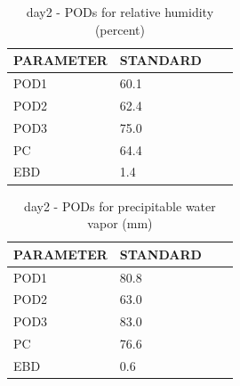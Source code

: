 \begin{table}[p!]
\begin{center}
\begin{tabular}{|l|l|l|l|}
\hline
\multicolumn{1}{|c|}{\cellcolor[HTML]{C0C0C0}\textbf{PARAMETER}} & \multicolumn{1}{c|}{\cellcolor[HTML]{C0C0C0}\textbf{STANDARD}} \\
\hline
\cellcolor[HTML]{C0C0C0}POD1  & 60.1                                \\
\cellcolor[HTML]{C0C0C0}POD2  & 62.4                                \\
\cellcolor[HTML]{C0C0C0}POD3  & 75.0                                \\
\cellcolor[HTML]{C0C0C0}PC    & 64.4                                  \\
\cellcolor[HTML]{C0C0C0}EBD   & 1.4                                 \\
\hline
\end{tabular}
\caption{day2 - PODs for relative humidity (percent)}
\label{tab:podrh:day2}
\end{center}
\end{table}
\begin{table}[p!]
\begin{center}
\begin{tabular}{|l|l|l|l|}
\hline
\multicolumn{1}{|c|}{\cellcolor[HTML]{C0C0C0}\textbf{PARAMETER}} & \multicolumn{1}{c|}{\cellcolor[HTML]{C0C0C0}\textbf{STANDARD}} \\
\hline
\cellcolor[HTML]{C0C0C0}POD1  & 80.8                                \\
\cellcolor[HTML]{C0C0C0}POD2  & 63.0                                \\
\cellcolor[HTML]{C0C0C0}POD3  & 83.0                                \\
\cellcolor[HTML]{C0C0C0}PC    & 76.6                                  \\
\cellcolor[HTML]{C0C0C0}EBD   & 0.6                                 \\
\hline
\end{tabular}
\caption{day2 - PODs for precipitable water vapor (mm)}
\label{tab:podpwv:day2}
\end{center}
\end{table}
